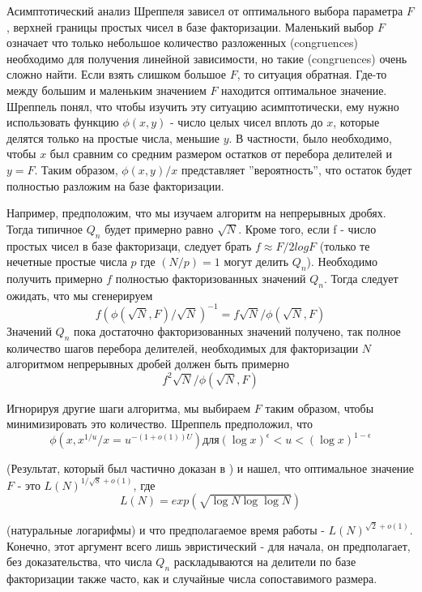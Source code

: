 \documentclass[russian, utf8, a4paper,12pt]{report}
\begin{document}
Асимптотический анализ Шреппеля зависел от оптимального выбора параметра $F$, верхней границы простых чисел в базе факторизации. Маленький выбор $F$ означает что только небольшое количество разложенных (congruences) необходимо для получения линейной зависимости, но такие (congruences) очень сложно найти. Если взять слишком большое $F$, то ситуация обратная. Где-то между большим и маленьким значением $F$ находится оптимальное значение. Шреппель понял, что чтобы изучить эту ситуацию асимптотически, ему нужно использовать функцию $\phi(x, y)$ - число целых чисел вплоть до $x$, которые делятся только на простые числа, меньшие $y$. В частности, было необходимо, чтобы $x$ был сравним со средним размером остатков от перебора делителей и  $y = F$. Таким образом, $\phi(x, y)/x$ представляет ''вероятность'', что остаток будет полностью разложим на базе факторизации.

Например, предположим, что мы изучаем алгоритм на непрерывных дробях. Тогда типичное $Q_n$ будет примерно равно $\sqrt{N}$. Кроме того, если f - число простых чисел в базе факторизаци, следует брать $f \approx F/2 logF$ (только те нечетные простые числа $p$ где $(N/p) = 1$ могут делить $Q_n$). Необходимо получить примерно $f$ полностью факторизованных значений $Q_n$. Тогда следует ожидать, что мы сгенерируем 
\begin{equation*}
f(\phi(\sqrt{N}, F)/\sqrt{N})^{-1} = f\sqrt{N}/\phi(\sqrt{N}, F)
\end{equation*} 
Значений $Q_n$ пока достаточно факторизованных значений получено, так полное количество шагов перебора делителей, необходимых для факторизации $N$ алгоритмом непрерывных дробей должен быть примерно
\begin{equation*}
f^2\sqrt{N}/\phi(\sqrt{N}, F)
\end{equation*}

Игнорируя другие шаги алгоритма, мы выбираем $F$ таким образом, чтобы минимизировать это количество. Шреппель предположил, что
\begin{equation*}
\phi(x, x^{1/u}/x = u^{-(1+o(1))U}) для (\log{x})^{\epsilon} < u < (\log{x})^{1-\epsilon}
\end{equation*}

(Результат, который был частично доказан в \cite{facnum}) и нашел, что оптимальное значение $F$ - это $L(N)^{1/\sqrt{8} + o(1)}$, где 
\begin{equation*}
L(N) = exp(\sqrt{\log{N}\log{\log{N}}})
\end{equation*}

(натуральные логарифмы) и что предполагаемое время работы - $L(N)^{\sqrt{2} + o(1)}$. Конечно, этот аргумент всего лишь эвристический - для начала, он предполагает, без доказательства, что числа $Q_n$ раскладываются на делители по базе факторизации также часто, как и случайные числа сопоставимого размера.
\end{document}
